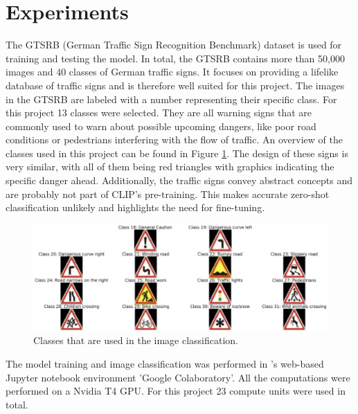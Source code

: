 \documentclass{article}
\begin{document}
\section{Experiments}
The GTSRB (German Traffic Sign Recognition Benchmark) dataset is used for training and testing the model. \cite{STALLKAMP2012323} In total, the GTSRB contains more than 50,000 images and 40 classes of German traffic signs. It focuses on providing a lifelike database of traffic signs and is therefore well suited for this project. The images in the GTSRB are labeled with a number representing their specific class. For this project 13 classes were selected. They are all warning signs that are commonly used to warn about possible upcoming dangers, like poor road conditions or pedestrians interfering with the flow of traffic. An overview of the classes used in this project can be found in Figure \ref{fig:gtsrb_classes}. The design of these signs is very similar, with all of them being red triangles with graphics indicating the specific danger ahead. Additionally, the traffic signs convey abstract concepts and are probably not part of CLIP's pre-training. This makes accurate zero-shot classification unlikely and highlights the need for fine-tuning.

\begin{figure}[h!]
    \centering
    \includegraphics[width=0.9\columnwidth]{images/gtsrb_classes.png}
    \caption{Classes that are used in the image classification.}
    \label{fig:gtsrb_classes}
\end{figure}

The model training and image classification was performed in \citet{GoogleColab}'s web-based Jupyter notebook environment 'Google Colaboratory'. All the computations were performed on a Nvidia T4 GPU. For this project 23 compute units were used in total.
\end{document}
